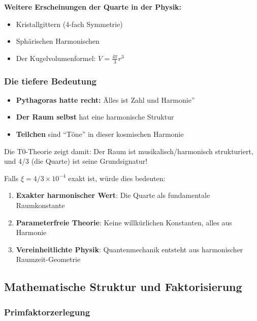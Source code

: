 	\textbf{Weitere Erscheinungen der Quarte in der Physik:}
	\begin{itemize}
		\item Kristallgittern (4-fach Symmetrie)
		\item Sphärischen Harmonischen
		\item Der Kugelvolumenformel: $V = \frac{4\pi}{3}r^3$
	\end{itemize}
	
	\subsubsection{Die tiefere Bedeutung}
	\label{subsubsec:tiefere_bedeutung}
	
	\begin{tcolorbox}[colback=green!5!white,colframe=green!75!black,title=Die pythagoreische Wahrheit]
		\begin{itemize}
			\item \textbf{Pythagoras hatte recht:} Älles ist Zahl und Harmonie''
			\item \textbf{Der Raum selbst} hat eine harmonische Struktur
			\item \textbf{Teilchen} sind ``Töne'' in dieser kosmischen Harmonie
		\end{itemize}
	\end{tcolorbox}
	
	Die T0-Theorie zeigt damit: Der Raum ist musikalisch/harmonisch strukturiert, und 4/3 (die Quarte) ist seine Grundsignatur!
	
	Falls $\xi = 4/3 \times 10^{-4}$ exakt ist, würde dies bedeuten:
	\begin{enumerate}
		\item \textbf{Exakter harmonischer Wert}: Die Quarte als fundamentale Raumkonstante
		\item \textbf{Parameterfreie Theorie}: Keine willkürlichen Konstanten, alles aus Harmonie
		\item \textbf{Vereinheitlichte Physik}: Quantenmechanik entsteht aus harmonischer Raumzeit-Geometrie
	\end{enumerate}
	
	\subsection{Mathematische Struktur und Faktorisierung}
	\label{subsec:mathematische_struktur}
	
	\subsubsection{Primfaktorzerlegung}
	\label{subsubsec:primfaktorzerlegung}
	
